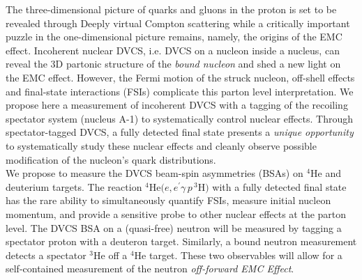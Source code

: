 %
The three-dimensional picture of quarks and gluons in the 
proton is set to be revealed through Deeply virtual Compton scattering  
while a critically important puzzle in the one-dimensional picture remains, 
namely, the origins of the EMC effect. Incoherent nuclear DVCS, i.e. DVCS on 
a nucleon inside a nucleus, can reveal the 3D partonic structure of 
the \emph{bound nucleon} and shed a new light on the EMC effect.
However, the Fermi motion of the struck nucleon, off-shell effects and 
final-state interactions (FSIs) complicate this parton level interpretation. 
We propose here a measurement of incoherent DVCS with a tagging of the 
recoiling spectator system (nucleus A-1) to systematically control nuclear effects.
Through spectator-tagged DVCS, a fully detected final state presents a 
\emph{unique opportunity}
to systematically study these nuclear effects and cleanly observe possible 
modification of the nucleon's quark distributions.\\


We propose to measure the DVCS beam-spin asymmetries (BSAs) on $^4$He and deuterium 
targets. The reaction $^4$He$(e,e^{\prime}\gamma\,p\,^3$H$)$ with a fully detected final state 
has the rare ability to simultaneously quantify FSIs, measure initial nucleon momentum,
and provide a sensitive probe to other nuclear effects at the parton level.
The DVCS BSA on a (quasi-free) neutron will be measured by tagging a spectator proton with a 
deuteron target. Similarly, a bound neutron measurement detects a spectator $^3$He off a $^4$He target.
These two observables will allow for a self-contained measurement of the neutron \emph{off-forward EMC Effect}.\\

